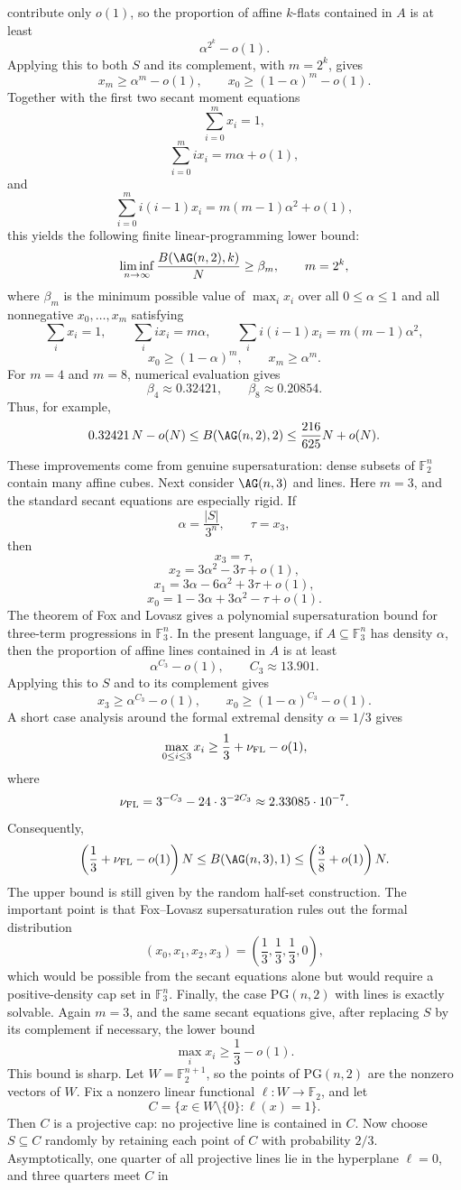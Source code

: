\documentclass[10pt]{article}
\newcommand{\PG}{\mathrm{PG}}
\theoremstyle{definition}
\begin{document}
contribute only \(o(1)\), so the proportion of affine \(k\)-flats contained in \(A\) is at least \[ \alpha^{2^k}-o(1). \] Applying this to both \(S\) and its complement, with \(m=2^k\), gives \[ x_m\geq \alpha^m-o(1), \qquad x_0\geq (1-\alpha)^m-o(1). \] Together with the first two secant moment equations \[ \sum_{i=0}^{m}x_i=1, \] \[ \sum_{i=0}^{m}i x_i=m\alpha+o(1), \] and \[ \sum_{i=0}^{m}i(i-1)x_i=m(m-1)\alpha^2+o(1), \] this yields the following finite linear-programming lower bound: \[ \liminf_{n\to\infty}\frac{B(\AG(n,2),k)}{N} \geq \beta_m, \qquad m=2^k, \] where \(\beta_m\) is the minimum possible value of \(\max_i x_i\) over all \(0\leq \alpha\leq1\) and all nonnegative \(x_0,\ldots,x_m\) satisfying \[ \sum_i x_i=1, \qquad \sum_i i x_i=m\alpha, \qquad \sum_i i(i-1)x_i=m(m-1)\alpha^2, \] \[ x_0\geq(1-\alpha)^m, \qquad x_m\geq\alpha^m. \] For \(m=4\) and \(m=8\), numerical evaluation gives \[ \beta_4\approx0.32421, \qquad \beta_8\approx0.20854. \] Thus, for example, \[ 0.32421\,N-o(N) \leq B(\AG(n,2),2) \leq \frac{216}{625}N+o(N). \] These improvements come from genuine supersaturation: dense subsets of \(\mathbb F_2^n\) contain many affine cubes. Next consider \(\AG(n,3)\) and lines. Here \(m=3\), and the standard secant equations are especially rigid. If \[ \alpha=\frac{|S|}{3^n}, \qquad \tau=x_3, \] then \[ x_3=\tau, \] \[ x_2=3\alpha^2-3\tau+o(1), \] \[ x_1=3\alpha-6\alpha^2+3\tau+o(1), \] \[ x_0=1-3\alpha+3\alpha^2-\tau+o(1). \] The theorem of Fox and Lovasz \cite{FoxLovaszATR} gives a polynomial supersaturation bound for three-term progressions in \(\mathbb F_3^n\). In the present language, if \(A\subseteq\mathbb F_3^n\) has density \(\alpha\), then the proportion of affine lines contained in \(A\) is at least \[ \alpha^{C_3}-o(1), \qquad C_3\approx13.901. \] Applying this to \(S\) and to its complement gives \[ x_3\geq \alpha^{C_3}-o(1), \qquad x_0\geq(1-\alpha)^{C_3}-o(1). \] A short case analysis around the formal extremal density \(\alpha=1/3\) gives \[ \max_{0\leq i\leq3}x_i \geq \frac13+\nu_{\rm FL}-o(1), \] where \[ \nu_{\rm FL} = 3^{-C_3}-24\cdot3^{-2C_3} \approx 2.33085\cdot10^{-7}. \] Consequently, \[ \left(\frac13+\nu_{\rm FL}-o(1)\right)N \leq B(\AG(n,3),1) \leq \left(\frac38+o(1)\right)N. \] The upper bound is still given by the random half-set construction. The important point is that Fox--Lovasz supersaturation rules out the formal distribution \[ (x_0,x_1,x_2,x_3)=\left(\frac13,\frac13,\frac13,0\right), \] which would be possible from the secant equations alone but would require a positive-density cap set in \(\mathbb F_3^n\). Finally, the case \(\PG(n,2)\) with lines is exactly solvable. Again \(m=3\), and the same secant equations give, after replacing \(S\) by its complement if necessary, the lower bound \[ \max_i x_i\geq \frac13-o(1). \] This bound is sharp. Let \(W=\mathbb F_2^{n+1}\), so the points of \(\PG(n,2)\) are the nonzero vectors of \(W\). Fix a nonzero linear functional \(\ell:W\to\mathbb F_2\), and let \[ C=\{x\in W\setminus\{0\}:\ell(x)=1\}. \] Then \(C\) is a projective cap: no projective line is contained in \(C\). Now choose \(S\subseteq C\) randomly by retaining each point of \(C\) with probability \(2/3\). Asymptotically, one quarter of all projective lines lie in the hyperplane \(\ell=0\), and three quarters meet \(C\) in 
\end{document}
